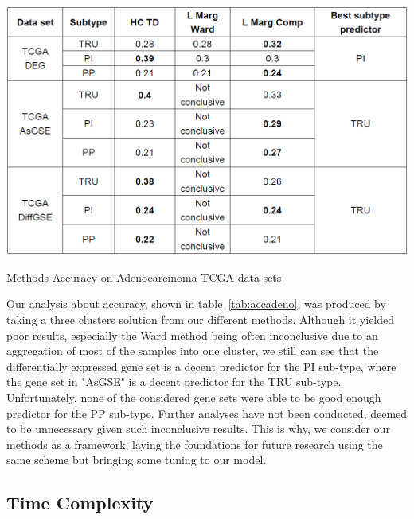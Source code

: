 \documentclass[twocolumn]{article}
\begin{document}
\begin{table}[!]
    \centering
    \includegraphics[scale=0.3]{img/AccAdeno.png}
    \caption{Methods Accuracy on Adenocarcinoma TCGA data sets}
    \label{tab:accadeno}
\end{table}
Our analysis about accuracy, shown in table~\ref{tab:accadeno}, was produced by taking a three clusters solution from our different methods.
Although it yielded poor results, especially the Ward method being often inconclusive due to an aggregation of most of the samples into one cluster, we still can see that the differentially expressed gene set is a decent predictor for the PI sub-type, where the gene set in "AsGSE" is a decent predictor for the TRU sub-type. Unfortunately, none of the considered gene sets were able to be good enough predictor for the PP sub-type.
Further analyses have not been conducted, deemed to be unnecessary given such inconclusive results.
This is why, we consider our methods as a framework, laying the foundations for future research using the same scheme but bringing some tuning to our model.

\subsection{Time Complexity}\label{sec:tps}
\end{document}
